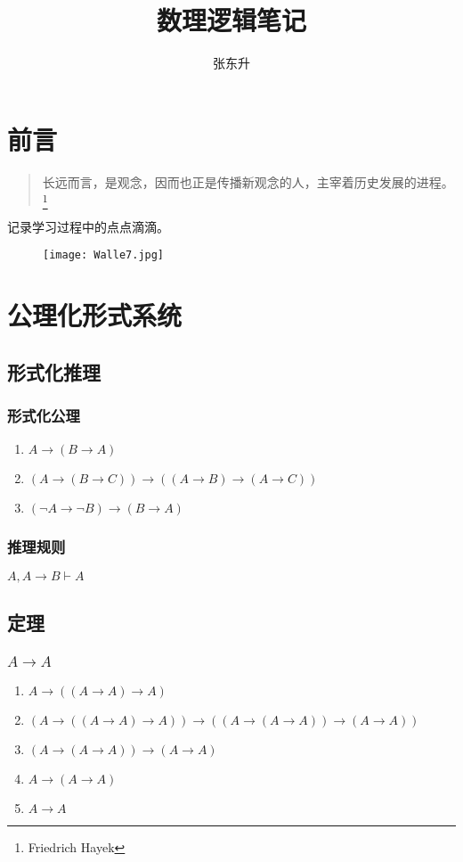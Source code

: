 \documentclass[UTF8]{ctexbook}
\title{数理逻辑笔记}
\author{张东升}
\date{}
\begin{document}
\maketitle
\thispagestyle{empty}

\tableofcontents
\thispagestyle{empty}

\chapter{前言}
\thispagestyle{empty}
\begin{quote}
	\kaishu 长远而言，是观念，因而也正是传播新观念的人，主宰着历史发展的进程。\footnote{Friedrich Hayek}
\end{quote}
记录学习过程中的点点滴滴。

\begin{figure}[ht]
	\texttt{[image: Walle7.jpg]}
\end{figure}

\chapter{公理化形式系统}
\section{形式化推理}
\subsection{形式化公理}
\begin{enumerate}
	\item $A\rightarrow (B\rightarrow A)$
	\item $(A\rightarrow (B\rightarrow C))\rightarrow ((A\rightarrow B)\rightarrow (A\rightarrow C))$
	\item $(\neg A\rightarrow \neg B)\rightarrow (B\rightarrow A)$
\end{enumerate}

\subsection{推理规则}
$A,A\rightarrow B\vdash A$

\section{定理}
\subsection{$A\rightarrow A$}
\begin{enumerate}
	\item $A\rightarrow ((A\rightarrow A)\rightarrow A)$
	\item $(A\rightarrow ((A\rightarrow A)\rightarrow A))\rightarrow ((A\rightarrow (A\rightarrow A))\rightarrow (A\rightarrow A))$
	\item $(A\rightarrow (A\rightarrow A))\rightarrow (A\rightarrow A)$
	\item $A\rightarrow (A\rightarrow A)$
	\item $A\rightarrow A$
\end{enumerate}
\end{document}
